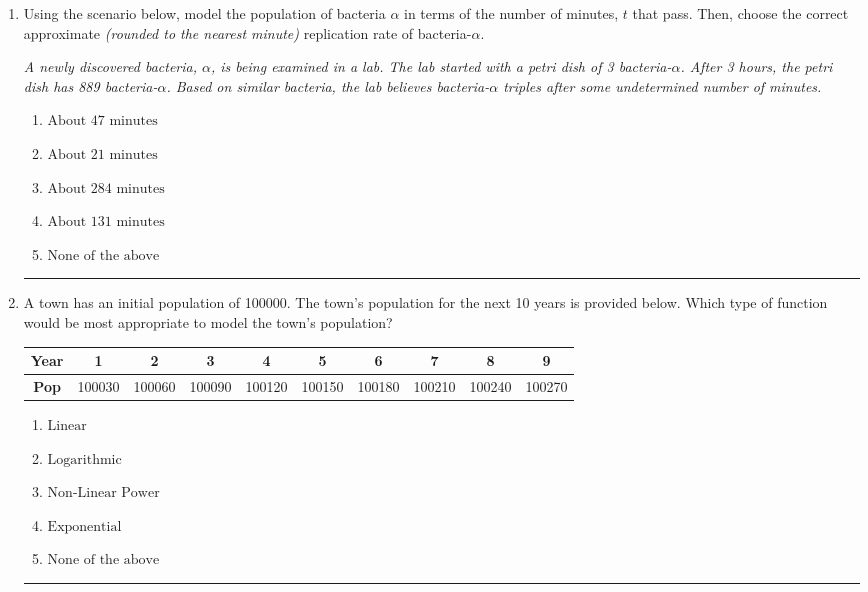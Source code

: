 \documentclass[14pt]{extbook}
\newcommand{\litem}[1]{\item#1\hspace*{-1cm}\rule{\textwidth}{0.4pt}}
\begin{document}
\begin{enumerate}
{\begin{enumerate}[label=\Alph*.]
\end{enumerate} }
\litem{
Using the scenario below, model the population of bacteria $\alpha$ in terms of the number of minutes, $t$ that pass. Then, choose the correct approximate \textit{(rounded to the nearest minute)} replication rate of bacteria-$\alpha$.
\begin{center}
    \textit{ A newly discovered bacteria, $\alpha$, is being examined in a lab. The lab started with a petri dish of 3 bacteria-$\alpha$. After 3 hours, the petri dish has 889 bacteria-$\alpha$. Based on similar bacteria, the lab believes bacteria-$\alpha$ triples after some undetermined number of minutes. }
\end{center}
\begin{enumerate}[label=\Alph*.]
\item \( \text{About } 47 \text{ minutes} \)
\item \( \text{About } 21 \text{ minutes} \)
\item \( \text{About } 284 \text{ minutes} \)
\item \( \text{About } 131 \text{ minutes} \)
\item \( \text{None of the above} \)

\end{enumerate} }
\litem{
A town has an initial population of 100000. The town's population for the next 10 years is provided below. Which type of function would be most appropriate to model the town's population?

\begin{tabular}{c|c|c|c|c|c|c|c|c|c}
\textbf{Year} &1 &2 &3 &4 &5 &6 &7 &8 &9\tabularnewline \hline
\textbf{Pop} &100030 &100060 &100090 &100120 &100150 &100180 &100210 &100240 &100270\end{tabular}\begin{enumerate}[label=\Alph*.]
\item \( \text{Linear} \)
\item \( \text{Logarithmic} \)
\item \( \text{Non-Linear Power} \)
\item \( \text{Exponential} \)
\item \( \text{None of the above} \)


\end{enumerate}}
\end{enumerate}
\end{document}
